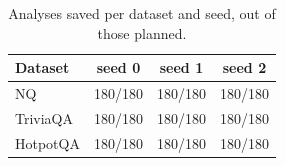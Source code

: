 \begin{table}
\centering
\small
\begin{tabular}{@{}lccc@{}}
\toprule
Dataset & seed 0 & seed 1 & seed 2 \\
\midrule
NQ & 180/180 & 180/180 & 180/180 \\
TriviaQA & 180/180 & 180/180 & 180/180 \\
HotpotQA & 180/180 & 180/180 & 180/180 \\
\bottomrule
\end{tabular}
\caption{Analyses saved per dataset and seed, out of those planned.}
\label{tab:status}
\end{table}
